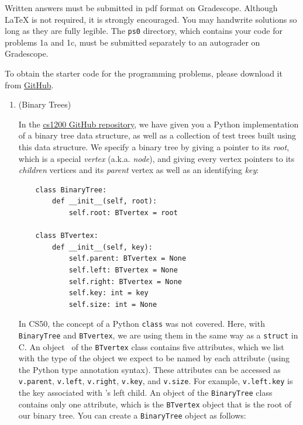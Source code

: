 \documentclass[11pt]{article}
\begin{document}
Written answers must be submitted in pdf format on Gradescope. Although \LaTeX{} is not required, it is strongly encouraged. You may handwrite solutions so long as they are fully legible. The \texttt{ps0} directory, which contains your code for problems 1a and 1c, must be submitted separately to an autograder on Gradescope. 

To obtain the starter code for the programming problems, please download it from \href{https://github.com/Harvard-CS-1200/Fall-2026/tree/main/ps0}{GitHub}.

 \newcommand{\children}{\mathit{children}}
 \newcommand{\parent}{\mathit{parent}}
 
\begin{enumerate}
\item (Binary Trees) 

 In the \href{https://github.com/Harvard-CS-1200/Fall-2026}{cs1200 GitHub repository},
 we have given you a Python implementation of a binary tree data structure, as well as a collection of test trees built using this data structure.  We specify a binary tree by giving a pointer to its {\em root}, which is a special {\em vertex} (a.k.a. {\em node}), and giving every vertex pointers to its {\em children} vertices and its {\em parent} vertex as well as an identifying {\em key}: 
 
 \begin{verbatim}
    class BinaryTree:
        def __init__(self, root):
            self.root: BTvertex = root
 
    class BTvertex:
        def __init__(self, key):
            self.parent: BTvertex = None
            self.left: BTvertex = None
            self.right: BTvertex = None
            self.key: int = key
            self.size: int = None
 \end{verbatim}


 In CS50, the concept of a Python \texttt{class} was not covered. Here, with \texttt{BinaryTree} and \texttt{BTvertex}, we are using them in the same way as a \texttt{struct} in C. An object \btv\ of the \texttt{BTvertex} class contains five attributes, which we list with the type of the object we expect to be named by each attribute (using the Python type annotation syntax). These attributes can be accessed as \texttt{v.parent}, \texttt{v.left}, \texttt{v.right}, \texttt{v.key}, and \texttt{v.size}. 
 For example, \texttt{v.left.key} is the key associated with \btv's left child. An object of the \texttt{BinaryTree} class contains only one attribute, which is the \texttt{BTvertex} object that is the root of our binary tree. You can create a \texttt{BinaryTree} object as follows:
 

\end{enumerate}
\end{document}
